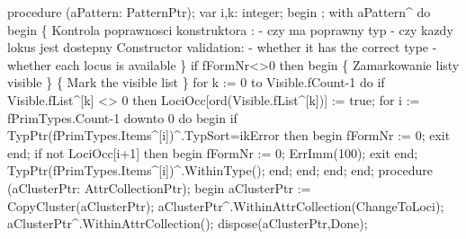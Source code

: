 \nwenddocs{}\endmoddef\nwstartdeflinemarkup{}\nwenddeflinemarkup
procedure (aPattern: PatternPtr);
var
   i,k: integer;
begin
   ;
   with aPattern^ do
   begin
      \{ Kontrola poprawnosci konstruktora :
        - czy ma poprawny typ
        - czy kazdy lokus jest dostepny
      Constructor validation:
        - whether it has the correct type
        - whether each locus is available \}
      if fFormNr<>0 then
      begin
         \{ Zamarkowanie listy visible \} \{ Mark the visible list \}
         for k := 0 to Visible.fCount-1 do
            if Visible.fList^[k] <> 0 then
               LociOcc[ord(Visible.fList^[k])] := true;
         for i := fPrimTypes.Count-1 downto 0 do
         begin
            if TypPtr(fPrimTypes.Items^[i])^.TypSort=ikError
            then begin fFormNr := 0; exit end;
            if not LociOcc[i+1] then
            begin fFormNr := 0; ErrImm(100); exit end;
            TypPtr(fPrimTypes.Items^[i])^.WithinType();
         end;
      end;
   end;
end;
\eatline
{}\nwendcode{}\nwdocspar
\nwenddocs{}\endmoddef\nwstartdeflinemarkup{}\nwenddeflinemarkup
procedure (aClusterPtr: AttrCollectionPtr);
begin
   aClusterPtr := CopyCluster(aClusterPtr);
   aClusterPtr^.WithinAttrCollection(ChangeToLoci);
   aClusterPtr^.WithinAttrCollection();
   dispose(aClusterPtr,Done);
